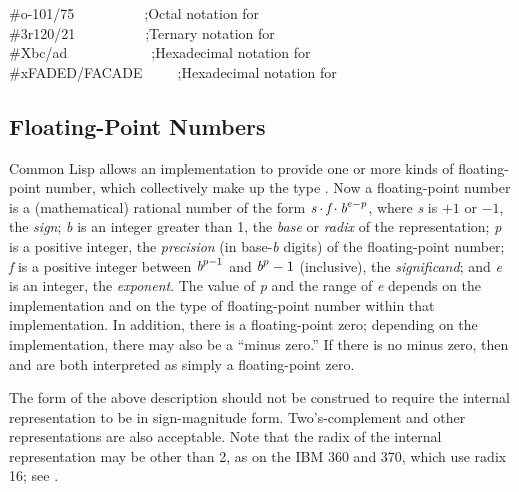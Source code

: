 \begin{lisp}
\#o-101/75~~~~~~~~~~;\textrm{Octal notation for } \\
\#3r120/21~~~~~~~~~~;\textrm{Ternary notation for } \\
\#Xbc/ad~~~~~~~~~~~~;\textrm{Hexadecimal notation for } \\
\#xFADED/FACADE~~~~~;\textrm{Hexadecimal notation for }
\end{lisp}

\subsection{Floating-Point Numbers}

Common Lisp allows an implementation to provide one or more kinds of
floating-point number, which collectively make up the type .
Now a floating-point number is a (mathematical)
rational number of the form
$\emph{s} \cdot \emph{f} \cdot \emph{b}^{e-p}$,
where \emph{s} is $+1$ or $-1$, the \emph{sign};
\emph{b} is an integer greater than 1,
the \emph{base} or \emph{radix} of the representation;
\emph{p} is a positive integer,
the \emph{precision} (in base-\emph{b} digits) of the floating-point number;
\emph{f} is a positive integer between
$\emph{b}^{p-1}$ and $\emph{b}^{p}-1$ (inclusive),
the \emph{significand};
and \emph{e} is an integer, the \emph{exponent}.
The value of \emph{p} and the range of \emph{e}
depends on the implementation and on the type of floating-point number
within that implementation.
In addition, there is a floating-point zero;
depending on the implementation, there may also be a ``minus zero.''
If there is no minus zero, then  and  are
both interpreted as simply a floating-point zero.

\beforenoterule
\begin{implementation}
The form of the above description should not be construed
to require the internal representation to be in sign-magnitude form.
Two's-complement and other representations are also acceptable.  Note
that the radix of the internal representation may be other than 2, as on
the IBM 360 and 370, which use radix 16; see
.
\end{implementation}
\afternoterule

